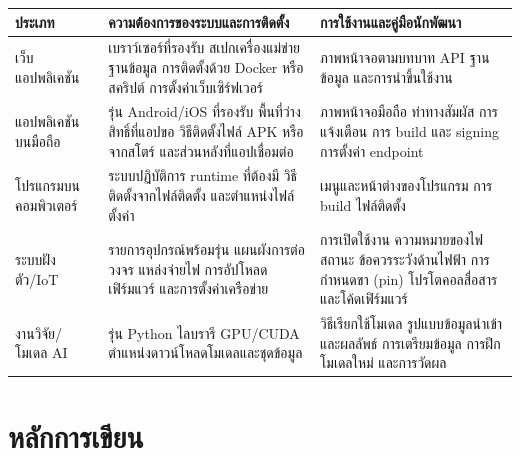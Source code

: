 \addtocounter{table}{-1}%
\begin{longtable}{|L{2.6cm}|L{\linewidth-1.3cm-3\arrayrulewidth\relax}|L{\linewidth-1.3cm-3\arrayrulewidth\relax}|}
\hline
\textbf{ประเภท} & \textbf{ความต้องการของระบบและการติดตั้ง} & \textbf{การใช้งานและคู่มือนักพัฒนา} \\ \hline
\endhead
เว็บแอปพลิเคชัน & เบราว์เซอร์ที่รองรับ สเปกเครื่องแม่ข่าย ฐานข้อมูล การติดตั้งด้วย Docker หรือสคริปต์ การตั้งค่าเว็บเซิร์ฟเวอร์
  & ภาพหน้าจอตามบทบาท \newline API ฐานข้อมูล และการนำขึ้นใช้งาน \\ \hline
แอปพลิเคชันบนมือถือ & รุ่น Android/iOS ที่รองรับ พื้นที่ว่าง สิทธิ์ที่แอปขอ วิธีติดตั้งไฟล์ APK หรือจากสโตร์ และส่วนหลังที่แอปเชื่อมต่อ
  & ภาพหน้าจอมือถือ ท่าทางสัมผัส การแจ้งเตือน \newline การ build และ signing การตั้งค่า endpoint \\ \hline
โปรแกรมบนคอมพิวเตอร์ & ระบบปฏิบัติการ runtime ที่ต้องมี วิธีติดตั้งจากไฟล์ติดตั้ง และตำแหน่งไฟล์ตั้งค่า
  & เมนูและหน้าต่างของโปรแกรม \newline การ build ไฟล์ติดตั้ง \\ \hline
ระบบฝังตัว/IoT & รายการอุปกรณ์พร้อมรุ่น แผนผังการต่อวงจร แหล่งจ่ายไฟ การอัปโหลดเฟิร์มแวร์ และการตั้งค่าเครือข่าย
  & การเปิดใช้งาน ความหมายของไฟสถานะ ข้อควรระวังด้านไฟฟ้า \newline การกำหนดขา (pin) โปรโตคอลสื่อสาร และโค้ดเฟิร์มแวร์ \\ \hline
งานวิจัย/โมเดล AI & รุ่น Python ไลบรารี GPU/CUDA ตำแหน่งดาวน์โหลดโมเดลและชุดข้อมูล
  & วิธีเรียกใช้โมเดล รูปแบบข้อมูลนำเข้าและผลลัพธ์ \newline การเตรียมข้อมูล การฝึกโมเดลใหม่ และการวัดผล \\ \hline
\end{longtable}

\section*{หลักการเขียน}

